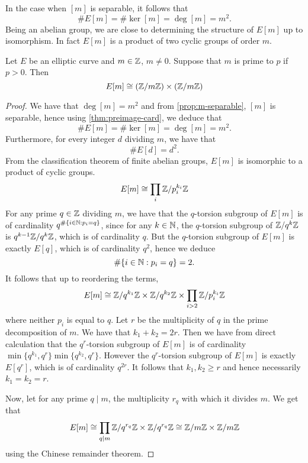 In the case when $[m]$ is separable, it follows that
\begin{equation*}
	\#E[m] = \#\ker[m] = \deg[m] = m^2.
\end{equation*}
Being an abelian group, we
are close to determining the structure of $E[m]$ up to isomorphism.
In fact $E[m]$ is a product of two cyclic groups of order $m$.

\begin{proposition}
	\label{prop:E-m-structure}
	Let $E$ be an elliptic curve and $m \in \mathbb{Z}$, $m \neq 0$.
	Suppose that $m$
	is prime to $p$ if $p > 0$. Then
	\begin{equation*}
		E[m] \cong (\mathbb{Z}/m\mathbb{Z})\times (\mathbb{Z}/m\mathbb{Z})
	\end{equation*}
\end{proposition}

\begin{proof}
	We have that $\deg[m] = m^2$ and
	from \ref{prop:m-separable}, $[m]$ is separable, hence
	using \ref{thm:preimage-card}, we deduce that
	\begin{equation*}
		\#E[m] = \#\ker[m] = \deg[m] = m^2.
	\end{equation*}
	Furthermore, for every integer $d$ dividing $m$, we have that
	\begin{equation*}
		\#E[d] = d^2.
	\end{equation*}
	From the classification theorem of finite abelian groups, $E[m]$ is
	isomorphic to a product of cyclic groups.
	\begin{equation*}
		E[m] \cong \prod_{i} \mathbb{Z}/p_i^{k_i}\mathbb{Z}
	\end{equation*}
	For any prime $q \in \mathbb{Z}$ dividing $m$,
	we have that the $q$-torsion subgroup of $E[m]$
	is of cardinality $q^{\#\{i \in \mathbb{N} : p_i = q\}}$, since for any
	$k \in \mathbb{N}$, the $q$-torsion subgroup of $\mathbb{Z}/q^k\mathbb{Z}$ is
	$q^{k-1}\mathbb{Z}/q^k\mathbb{Z}$, which is of cardinality $q$.
	But the $q$-torsion subgroup of $E[m]$ is exactly $E[q]$, which is
	of cardinality $q^2$, hence we deduce
	\begin{equation*}
		\#\{i \in \mathbb{N}: p_i = q\} = 2.
	\end{equation*}
	It follows that up to reordering the terms,
	\begin{equation*}
		E[m] \cong \mathbb{Z}/q^{k_1}\mathbb{Z} \times \mathbb{Z}/q^{k_2}\mathbb{Z} \times 
		\prod_{i > 2}\mathbb{Z}/p_i^{k_i}\mathbb{Z}
	\end{equation*}
	where neither $p_i$ is equal to $q$. Let $r$ be the multiplicity of
	$q$ in the prime decomposition of $m$. We have that $k_1 + k_2 = 2r$.
	Then we have from direct calculation that
	the $q^r$-torsion subgroup of $E[m]$ is of cardinality
	$\min\{q^{k_1}, q^r\}\min\{q^{k_2}, q^{r}\}$.
	However the $q^r$-torsion subgroup of $E[m]$ is exactly $E[q^r]$, which
	is of cardinality $q^{2r}$.
	It follows that $k_1, k_2 \geq r$ and hence necessarily $k_1 = k_2 = r$.
	
	Now, let for any prime $q \mid m$, the multiplicity $r_q$ with which
	it divides $m$. We get that
	\begin{equation*}
		E[m] \cong \prod_{q \mid m}\mathbb{Z}/q^{r_q}\mathbb{Z}\times \mathbb{Z}/q^{r_q}\mathbb{Z}
		\cong \mathbb{Z}/m\mathbb{Z}\times \mathbb{Z}/m\mathbb{Z}
	\end{equation*}
	using the Chinese remainder theorem.
\end{proof}

